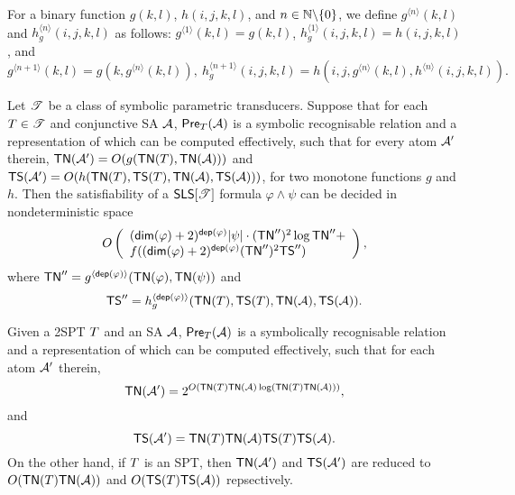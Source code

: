 For a binary function $g(k, l)$, $h(i, j, k, l)$, and $n \in \mathbb{N} \backslash \{0\}$, we define $g^{\langle n \rangle}(k, l)$ and $h^{\langle n \rangle}_g(i, j, k, l)$ as follows: $g^{\langle 1 \rangle}( k, l) = g(k, l)$, $h^{\langle 1 \rangle}_g(i, j, k, l) = h(i, j, k, l)$, and 
$$g^{\langle n+1 \rangle}( k, l) = g(k, g^{\langle n \rangle}( k, l)), \ h^{\langle n+1 \rangle}_g (i, j, k, l) = h(i, j, g^{\langle n \rangle}(k, l), h^{\langle n \rangle}(i, j, k, l)).$$
\begin{theorem}\label{thm-generic-dec-symbolic}
Let $\mathscr{T}$ be a class of symbolic parametric transducers. Suppose that %
for each $T \in \mathscr{T}$ and conjunctive SA $\mathcal{A}$, $\textsf{Pre}_{T}(\mathcal{A})$ is a symbolic recognisable relation and a representation of which can be computed effectively, 
such that for every atom $\mathcal{A}'$ therein, 
$\mathsf{TN}(\mathcal{A}') = O(g(\mathsf{TN}(T),  \mathsf{TN}(\mathcal{A})))$ and 
$\mathsf{TS}(\mathcal{A}') = O(h(\mathsf{TN}(T), \mathsf{TS}(T), \mathsf{TN}(\mathcal{A}), \mathsf{TS}(\mathcal{A})))$, for two monotone functions $g$ and $h$.
Then the satisfiability of a $\textsf{SLS}[\mathscr{T}]$ formula $\varphi \wedge \psi$ can be decided in nondeterministic space
$$
O\left(
\begin{array}{l}
(\mathsf{dim}(\varphi)+2)^{\mathsf{dep}(\varphi)}|\psi| \cdot (\mathsf{TN}'')^2 \log \mathsf{TN}'' + \\
f((\mathsf{dim}(\varphi)+2)^{\mathsf{dep}(\varphi)} (\mathsf{TN}'')^2 \mathsf{TS}'')  
\end{array}
\right),
$$ 
where $\mathsf{TN}'' = g^{\langle \mathsf{dep}(\varphi) \rangle}(\mathsf{TN}(\varphi), \mathsf{TN}(\psi))$ and 
$$\mathsf{TS}'' = h^{\langle \mathsf{dep}(\varphi) \rangle}_g(\mathsf{TN}(T), \mathsf{TS}(T), \mathsf{TN}(\mathcal{A}), \mathsf{TS}(\mathcal{A})).$$
\end{theorem}


\begin{lemma}\label{lem-spt}
Given a 2SPT $T$ and an SA $\mathcal{A}$, $\textsf{Pre}_{T}(\mathcal{A})$ is a symbolically recognisable relation and a representation of which can be computed effectively, such that for each atom $\mathcal{A}'$ therein, 
$$\mathsf{TN}(\mathcal{A}') = 2^{O(\mathsf{TN}(T)\mathsf{TN}(\mathcal{A}) \log (\mathsf{TN}(T)\mathsf{TN}(\mathcal{A})))},$$ 
and 
$$\mathsf{TS}(\mathcal{A}') = \mathsf{TN}(T) \mathsf{TN}(\mathcal{A})\mathsf{TS}(T) \mathsf{TS}(\mathcal{A}).$$
On the other hand, if $T$ is an SPT, then $\mathsf{TN}(\mathcal{A}')$ and $\mathsf{TS}(\mathcal{A}')$ are reduced to $O(\mathsf{TN}(T)\mathsf{TN}(\mathcal{A}))$ and $O(\mathsf{TS}(T) \mathsf{TS}(\mathcal{A}))$ repsectively.
\end{lemma}

